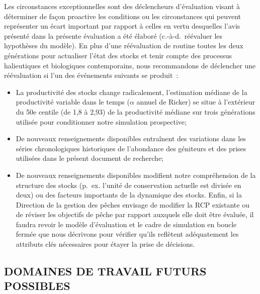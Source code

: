 \documentclass[french,11pt]{book}
\begin{document}
Les circonstances exceptionnelles sont des déclencheurs d'évaluation visant à déterminer de façon proactive les conditions ou les circonstances qui peuvent représenter un écart important par rapport à celles en vertu desquelles l'avis présenté dans la présente évaluation a été élaboré (c.-à-d.~réévaluer les hypothèses du modèle). En plus d'une réévaluation de routine toutes les deux générations pour actualiser l'état des stocks et tenir compte des processus halieutiques et biologiques contemporains, nous recommandons de déclencher une réévaluation si l'un des événements suivants se produit~:
\begin{itemize}
\item
  La productivité des stocks change radicalement, l'estimation médiane de la productivité variable dans le temps (\(\alpha\) annuel de Ricker) se situe à l'extérieur du 50e centile (de 1,8 à 2,93) de la productivité médiane sur trois générations utilisée pour conditionner notre simulation prospective;
\item
  De nouveaux renseignements disponibles entraînent des variations dans les séries chronologiques historiques de l'abondance des géniteurs et des prises utilisées dans le présent document de recherche;
\item
  De nouveaux renseignements disponibles modifient notre compréhension de la structure des stocks (p.~ex. l'unité de conservation actuelle est divisée en deux) ou des facteurs importants de la dynamique des stocks. Enfin, si la Direction de la gestion des pêches envisage de modifier la RCP existante ou de réviser les objectifs de pêche par rapport auxquels elle doit être évaluée, il faudra revoir le modèle d'évaluation et le cadre de simulation en boucle fermée que nous décrivons pour vérifier qu'ils reflètent adéquatement les attributs clés nécessaires pour étayer la prise de décisions.
\end{itemize}
\hypertarget{domaines-de-travail-futurs-possibles}{%
\subsection{DOMAINES DE TRAVAIL FUTURS POSSIBLES}\label{domaines-de-travail-futurs-possibles}}
\end{document}
